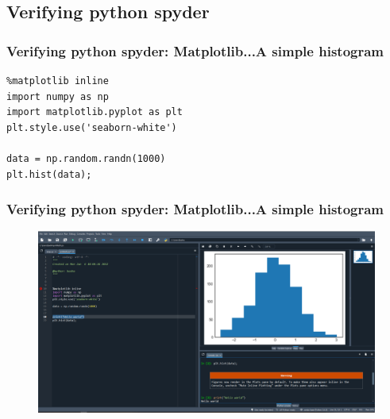 \documentclass{beamer}
\begin{document}
\subsection{Verifying python spyder }
\begin{frame}[fragile] %
\frametitle{Verifying python spyder: Matplotlib...A simple histogram}
\begin{example}[]
\begin{verbatim}
%matplotlib inline
import numpy as np
import matplotlib.pyplot as plt
plt.style.use('seaborn-white')

data = np.random.randn(1000)
plt.hist(data);\end{verbatim}
\end{example}
\end{frame}
\begin{frame}
\frametitle{Verifying python spyder: Matplotlib...A simple histogram}
\begin{figure}
\includegraphics[width=1\linewidth]{Seminar_1_images/Spyder.PNG}
\end{figure}
\end{frame}

\end{document}
